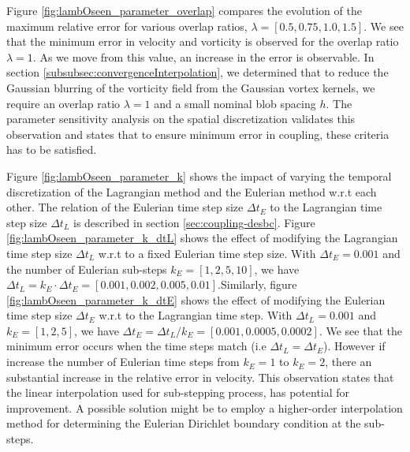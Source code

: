 Figure \ref{fig:lambOseen_parameter_overlap} compares the evolution of the maximum relative error for various overlap ratios, $\lambda = [0.5, 0.75, 1.0, 1.5]$. We see that the minimum error in velocity and vorticity is observed for the overlap ratio $\lambda = 1$. As we move from this value, an increase in the error is observable. In section \ref{subsubsec:convergenceInterpolation}, we determined that to reduce the Gaussian blurring of the vorticity field from the Gaussian vortex kernels, we require an overlap ratio $\lambda=1$ and a small nominal blob spacing $h$. The parameter sensitivity analysis on the spatial discretization validates this observation and states that to ensure minimum error in coupling, these criteria has to be satisfied.

Figure \ref{fig:lambOseen_parameter_k} shows the impact of varying the temporal discretization of the Lagrangian method and the Eulerian method w.r.t each other. The relation of the Eulerian time step size $\Delta t_E$ to the Lagrangian time step size $\Delta t_L$ is described in section \ref{sec:coupling-desbc}. Figure \ref{fig:lambOseen_parameter_k_dtL} shows the effect of modifying the Lagrangian time step size $\Delta t_L$ w.r.t to a fixed Eulerian time step size. With $\Delta t_E=0.001$ and the number of Eulerian sub-steps $k_E = [1,2,5,10]$, we have $\Delta t_L = k_E\cdot\Delta t_E = [0.001,0.002,0.005,0.01]$.Similarly, figure \ref{fig:lambOseen_parameter_k_dtE} shows the effect of modifying the Eulerian time step size $\Delta t_E$ w.r.t to the Lagrangian time step. With $\Delta t_L=0.001$ and $k_E = [1,2,5]$, we have $\Delta t_E = \Delta t_L/k_E = [0.001,0.0005,0.0002]$. We see that the minimum error occurs when the time steps match (i.e $\Delta t_L = \Delta t_E$). However if increase the number of Eulerian time steps from $k_E = 1 $ to $k_E=2$, there an substantial increase in the relative error in velocity. This observation states that the linear interpolation used for sub-stepping process, has potential for improvement. A possible solution might be to employ a higher-order interpolation method for determining the Eulerian Dirichlet boundary condition at the sub-steps.

%

